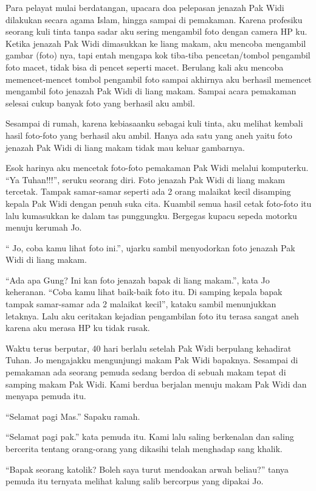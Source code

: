 Para pelayat mulai berdatangan,  upacara doa pelepasan jenazah Pak Widi dilakukan secara agama Islam, hingga sampai di pemakaman.  Karena profesiku seorang kuli tinta tanpa sadar aku sering mengambil foto dengan camera HP ku. Ketika  jenazah Pak Widi dimasukkan ke liang makam, aku mencoba mengambil gambar (foto) nya, tapi entah mengapa kok tiba-tiba pencetan/tombol pengambil foto macet, tidak bisa di pencet seperti macet. Berulang kali aku mencoba memencet-mencet tombol pengambil  foto sampai akhirnya aku berhasil memencet mengambil foto jenazah Pak Widi di liang makam. Sampai acara pemakaman selesai cukup banyak foto yang berhasil aku ambil.

Sesampai di rumah, karena kebiasaanku sebagai kuli tinta, aku melihat kembali hasil foto-foto  yang berhasil  aku ambil. Hanya ada satu yang aneh yaitu foto jenazah Pak Widi di liang makam tidak mau keluar gambarnya. 

Esok harinya aku mencetak foto-foto pemakaman Pak Widi melalui komputerku. ``Ya Tuhan!!!'', seruku seorang diri. Foto jenazah Pak Widi di liang makam tercetak. Tampak samar-samar seperti  ada 2 orang malaikat kecil disamping kepala Pak Widi dengan penuh suka cita.  Kuambil semua hasil cetak  foto-foto itu lalu kumasukkan ke dalam tas punggungku. Bergegas kupacu sepeda motorku menuju kerumah Jo.

`` Jo, coba kamu lihat foto ini.'', ujarku sambil menyodorkan foto jenazah Pak Widi di liang makam. 

``Ada apa Gung?  Ini kan foto jenazah bapak di liang makam.'', kata Jo keheranan. ``Coba kamu lihat baik-baik foto itu. Di samping kepala bapak tampak samar-samar ada 2 malaikat kecil'', kataku sambil menunjukkan letaknya. Lalu aku ceritakan kejadian pengambilan foto itu terasa sangat aneh karena aku merasa HP ku tidak rusak.

Waktu terus berputar, 40 hari berlalu setelah Pak Widi berpulang kehadirat Tuhan. Jo mengajakku mengunjungi makam Pak Widi bapaknya. Sesampai di pemakaman  ada seorang pemuda sedang berdoa di sebuah makam tepat di samping makam Pak Widi. Kami berdua berjalan menuju makam Pak Widi dan menyapa pemuda itu.

``Selamat pagi Mas.'' Sapaku ramah. 

``Selamat pagi pak.'' kata pemuda itu. Kami lalu saling berkenalan dan saling bercerita tentang orang-orang yang dikasihi telah menghadap sang khalik.

``Bapak seorang katolik? Boleh saya turut mendoakan arwah beliau?'' tanya pemuda itu ternyata melihat kalung salib bercorpus yang dipakai Jo.

